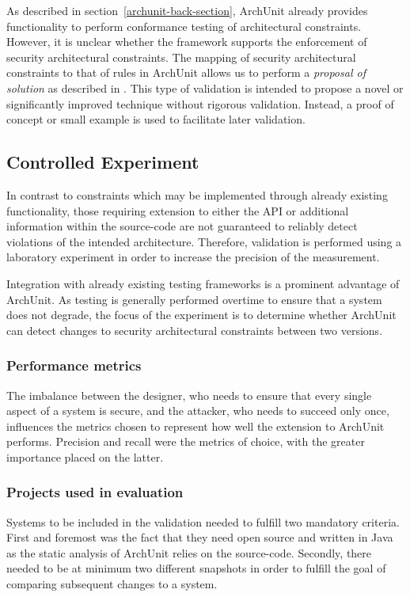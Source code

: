 As described in section~\ref{archunit-back-section}, ArchUnit already provides functionality to perform conformance testing of architectural constraints. However, it is unclear whether the framework supports the enforcement of security architectural constraints. The mapping of security architectural constraints to that of rules in ArchUnit allows us to perform a \textit{proposal of solution} as described in \cite{wieringa_requirements_2006}. This type of validation is intended to propose a novel or significantly improved technique without rigorous validation. Instead, a proof of concept or small example is used to facilitate later validation. 

\subsection{Controlled Experiment} \label{sec-controlled-experiment}
In contrast to constraints which may be implemented through already existing functionality, those requiring extension to either the API or additional information within the source-code are not guaranteed to reliably detect violations of the intended architecture. Therefore, validation is performed using a laboratory experiment \cite{stol_abc_2018} in order to increase the precision of the measurement. 

Integration with already existing testing frameworks is a prominent advantage of ArchUnit. As testing is generally performed overtime to ensure that a system does not degrade, the focus of the experiment is to determine whether ArchUnit can detect changes to security architectural constraints between two versions. 

\subsubsection{Performance metrics}
The imbalance between the designer, who needs to ensure that every single aspect of a system is secure, and the attacker, who needs to succeed only once, influences the metrics chosen to represent how well the extension to ArchUnit performs. Precision and recall were the metrics of choice, with the greater importance placed on the latter. 

\subsubsection{Projects used in evaluation}
Systems to be included in the validation needed to fulfill two mandatory criteria. First and foremost was the fact that they need open source and written in Java as the static analysis of ArchUnit relies on the source-code. Secondly, there needed to be at minimum two different snapshots in order to fulfill the goal of comparing subsequent changes to a system.  


